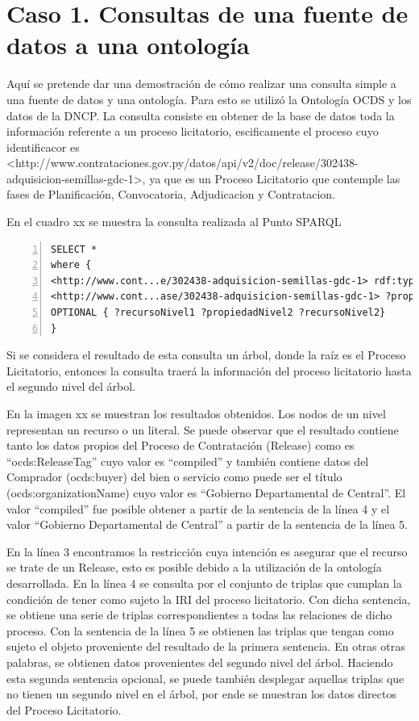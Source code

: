 \section{Caso 1. Consultas de una fuente de datos a una ontología}


Aquí se pretende dar una demostración de cómo realizar una consulta simple a una fuente de datos y una ontología. Para esto se utilizó la Ontología OCDS y los datos de la DNCP. La consulta consiste en obtener de la base de datos toda la información referente a un proceso licitatorio, escificamente el proceso cuyo identificacor es <http://www.contrataciones.gov.py/datos/api/v2/doc/release/302438-adquisicion-semillas-gdc-1>, ya que es un Proceso Licitatorio que contemple las fases de Planificación, Convocatoria, Adjudicacion y Contratacion.

En el cuadro xx se muestra la consulta realizada al Punto SPARQL




\begin{lstlisting}[captionpos=b, caption=Información referente al proceso licitatorio cuyo identificacor es 302438, label=lst:caso1,  numbers=left,  numberstyle=\tiny\color{mygray},
    basicstyle=\tiny,frame=single]
SELECT *  
where {    	
<http://www.cont...e/302438-adquisicion-semillas-gdc-1> rdf:type ocds:Release .
<http://www.cont...ase/302438-adquisicion-semillas-gdc-1> ?propiedadNivel1 ?recursoNivel1 .   
OPTIONAL { ?recursoNivel1 ?propiedadNivel2 ?recursoNivel2}
}  
 \end{lstlisting}


 Si se considera el resultado de esta consulta un árbol, donde la raíz es el Proceso Licitatorio, entonces la consulta traerá la información del proceso licitatorio hasta el segundo nivel del árbol.

En la imagen xx se muestran los resultados obtenidos. Los nodos de un nivel representan un recurso o un literal. Se puede observar que el resultado contiene tanto los datos propios del Proceso de Contratación (Release) como es “ocds:ReleaseTag” cuyo valor es “compiled” y también contiene datos del Comprador (ocds:buyer) del bien o servicio como puede ser el título (ocds:organizationName) cuyo valor es “Gobierno Departamental de Central”. El valor “compiled” fue posible obtener a partir de la sentencia de la línea 4 y el valor “Gobierno Departamental de Central” a partir de la sentencia de la línea 5.

En la línea 3 encontramos la restricción cuya intención es asegurar que el recurso se trate de un Release, esto es posible debido a la utilización de la ontología desarrollada. En la línea 4 se consulta por el conjunto de triplas que cumplan la condición de tener como sujeto la IRI del proceso licitatorio. Con dicha sentencia, se obtiene una serie de triplas correspondientes a todas las relaciones de dicho proceso. Con la sentencia de la línea 5 se obtienen las triplas que tengan como sujeto el objeto proveniente del resultado de la primera sentencia. En otras otras palabras, se obtienen datos provenientes del segundo nivel del árbol. Haciendo esta segunda sentencia opcional, se puede también desplegar aquellas triplas que no tienen un segundo nivel en el árbol, por ende se muestran los datos directos del Proceso Licitatorio.

